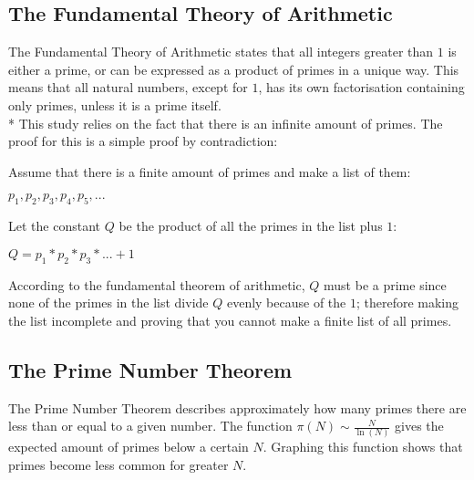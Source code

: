 \documentclass[main.tex]{subfiles}
\begin{document}
\subsection{The Fundamental Theory of Arithmetic} \label{arithmetic} The
Fundamental Theory of Arithmetic \cite{theorem:arithmetic} states that all
integers greater than $1$ is either a prime, or can be expressed as a product of
primes in a unique way. This means that all natural numbers, except for $1$, has
its own factorisation containing only primes, unless it is a prime itself.
\newline
\\*
This study relies on the fact that there is an infinite amount of primes. The
proof for this is a simple proof by contradiction:
\newpage
\begin{mdframed}
  \begin{center}
    Assume that there is a finite amount of primes and make a list of them:
  \end{center}

  \begin{center}
    $p_1, p_2, p_3, p_4, p_5, ...$
  \end{center}
  \newline

  \begin{center}
    Let the constant $Q$ be the product of all the primes in the list plus $1$:
  \end{center}

  \begin{center}
    $Q = p_1 * p_2 * p_3 * ... + 1$
  \end{center}
  \newline

  \centering
  According to the fundamental theorem of arithmetic, $Q$ must be a prime since
  none of the primes in the list divide $Q$ evenly because of the $1$; therefore
  making the list incomplete and proving that you cannot make a finite list of
  all primes.
\end{mdframed}
\vspace{5mm}

\newpage

\subsection{The Prime Number Theorem}
The Prime Number Theorem \cite{theorem:prime_num} describes approximately how
many primes there are less than or equal to a given number. The function $\pi(N)
\sim \frac{N}{\ln(N)}$ gives the expected amount of primes below a certain $N$.
Graphing this function shows that primes become less common for greater $N$. \\
\end{document}

